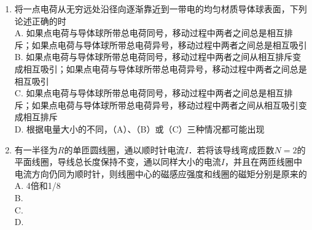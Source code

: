 \begin{enumerate}
\item 将一点电荷从无穷远处沿径向逐渐靠近到一带电的均匀材质导体球表面，下列论述正确的时\\
A. 如果点电荷与导体球所带总电荷同号，移动过程中两者之间总是相互排斥；如果点电荷与导体球所带总电荷异号，移动过程中两者之间总是相互吸引\\
B. 如果点电荷与导体球所带总电荷同号，移动过程中两者之间从相互排斥变成相互吸引；如果点电荷与导体球所带总电荷异号，移动过程中两者之间总是相互吸引\\
C. 如果点电荷与导体球所带总电荷同号，移动过程中两者之间总是相互排斥；如果点电荷与导体球所带总电荷异号，移动过程中两者之间从相互吸引变成相互排斥\\
D. 根据电量大小的不同，（A）、（B）或（C）三种情况都可能出现\\

\item 有一半径为$R$的单匝圆线圈，通以顺时针电流$I$．若将该导线弯成匝数$N=2$的平面线圈，导线总长度保持不变，通以同样大小的电流$I$，并且在两匝线圈中电流方向仍同为顺时针，则线圈中心的磁感应强度和线圈的磁矩分别是原来的\\
A. 4倍和1/8\\
B. \\
C. \\
D. \\
\end{enumerate}